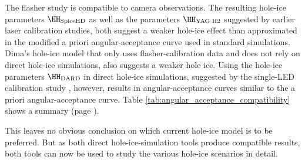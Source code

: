 The  flasher study is compatible to camera observations. The resulting hole-ice parameters $\HH_\text{SpiceHD}$ as well as the parameters $\HH_\text{YAG H2}$ suggested by earlier laser calibration studies, both suggest a weaker hole-ice effect than approximated in the modified a priori angular-acceptance curve used in standard \clsim simulations. Dima's hole-ice model that only uses flasher-calibration data and does not rely on direct hole-ice simulations, also suggests a weaker hole ice. Using the hole-ice parameters $\HH_\text{DARD}$ in direct hole-ice simulations, suggested by the single-LED calibration study , however, results in angular-acceptance curves similar to the a priori angular-acceptance curve. Table \ref{tab:angular_acceptance_compatibility} shows a summary (page \pageref{tab:angular_acceptance_compatibility}).

This leaves no obvious conclusion on which current hole-ice model is to be preferred. But as both direct hole-ice-simulation tools produce compatible results, both tools can now be used to study the various hole-ice scenarios in detail.

